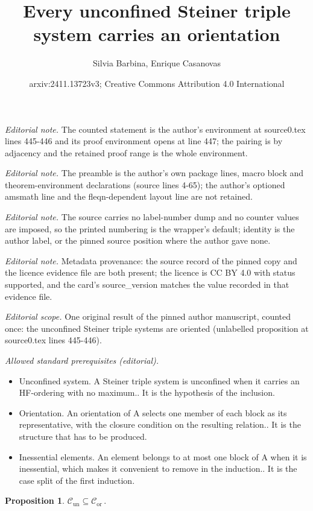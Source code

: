 \documentclass[10pt,a4paper]{article}
\title{Every unconfined Steiner triple system carries an orientation}
\author{Silvia Barbina, Enrique Casanovas}
\date{arxiv:2411.13723v3; Creative Commons Attribution 4.0 International}
\newcommand{\Cor}{\mathcal{C}_\mathrm{or}}
\newcommand{\Cun}{\mathcal{C}_\mathrm{un}}
\theoremstyle{note}
\newtheorem{prop}[thm]{Proposition}
\begin{document}
\maketitle
\noindent\textit{Editorial note.} The counted statement is the author's environment at source0.tex lines 445-446 and its proof environment opens at line 447; the pairing is by adjacency and the retained proof range is the whole environment.\par\medskip
\noindent\textit{Editorial note.} The preamble is the author's own package lines, macro block and theorem-environment declarations (source lines 4-65); the author's optioned amsmath line and the fleqn-dependent layout line are not retained.\par\medskip
\noindent\textit{Editorial note.} The source carries no label-number dump and no counter values are imposed, so the printed numbering is the wrapper's default; identity is the author label, or the pinned source position where the author gave none.\par\medskip
\noindent\textit{Editorial note.} Metadata provenance: the source record of the pinned copy and the licence evidence file are both present; the licence is CC BY 4.0 with status supported, and the card's source\_version matches the value recorded in that evidence file.\par\medskip
\noindent\textit{Editorial scope.} One original result of the pinned author manuscript, counted once: the unconfined Steiner triple systems are oriented (unlabelled proposition at source0.tex lines 445-446).\par\medskip
\noindent\textit{Allowed standard prerequisites (editorial).}\begin{itemize}
\item Unconfined system. A Steiner triple system is unconfined when it carries an HF-ordering with no maximum.. It is the hypothesis of the inclusion.
\item Orientation. An orientation of A selects one member of each block as its representative, with the closure condition on the resulting relation.. It is the structure that has to be produced.
\item Inessential elements. An element belongs to at most one block of A when it is inessential, which makes it convenient to remove in the induction.. It is the case split of the first induction.
\end{itemize}\medskip
\begin{prop} $\Cun\subseteq \Cor \, .$
\end{prop}
\end{document}
